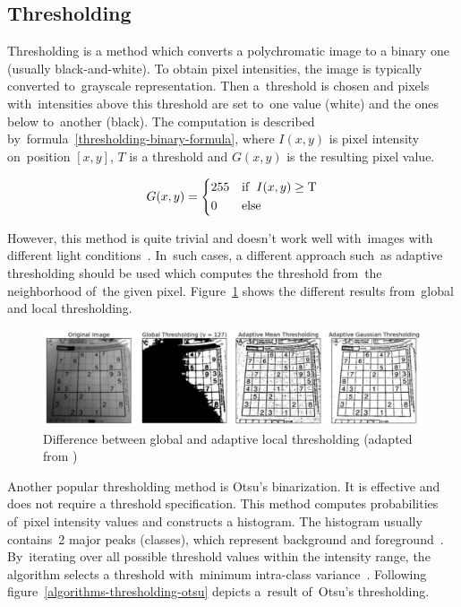 \subsection{Thresholding}
\label{algorithms-classical-thresholding}
Thresholding is a method which converts a polychromatic image to a binary one (\hbox{usually} black-and-white). To obtain pixel intensities, the image is typically converted to~grayscale representation. Then a~\hbox{threshold} is chosen and pixels with~intensities above this \hbox{threshold} are set to~one value (white) and the ones below to~another (black). The computation is described by~formula~\ref{thresholding-binary-formula}, where \(I(x, y)\) is pixel intensity on~position \([x, y]\), \(T\) is a threshold and \(G(x, y)\) is the resulting pixel value.

\begin{equation}
  \label{thresholding-binary-formula}
  G(x, y) = \begin{dcases}
 255 & \text{if}\hspace{6pt}I(x, y)\ge\text{T}
 \\
 0 & \text{else}
 \end{dcases}
\end{equation}

However, this method is quite trivial and doesn't work well with~images with different light conditions~\cite{opencv-library}. In~such cases, a different approach such~as adaptive thresholding should be used which computes the threshold from~the neighborhood of~the given pixel. Figure~\ref{algorithms-thresholding-local-global} shows the different results from~global and local thresholding.

\begin{figure}[hbt]
	\includegraphics[width=1\textwidth]{img/algorithms/thresholding-local-global.png}
	\caption{Difference between global and adaptive local thresholding (adapted from \cite{opencv-library})}
	\label{algorithms-thresholding-local-global}
\end{figure}

Another popular thresholding method is Otsu's binarization. It is effective and does not require a threshold specification. This method computes probabilities of~pixel intensity values and constructs a histogram. The histogram usually contains~2 major peaks (classes), which represent background and foreground~\cite{opencv-library}. By~iterating over all possible threshold values within the intensity range, the algorithm selects a threshold with~minimum \hbox{intra-class} variance~\cite{otsu-binarization}. Following figure~\ref{algorithms-thresholding-otsu} depicts a~result of~Otsu's thresholding.

